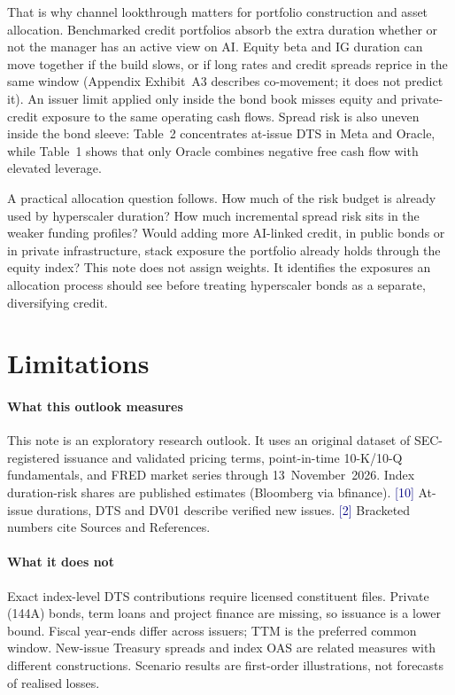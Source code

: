 \documentclass[10pt,letterpaper]{article}
\newcommand{\src}[1]{{\scriptsize\textcolor{navy}{[#1]}}}
\begin{document}
That is why channel lookthrough matters for portfolio construction and asset allocation. Benchmarked credit portfolios absorb the extra duration whether or not the manager has an active view on AI. Equity beta and IG duration can move together if the build slows, or if long rates and credit spreads reprice in the same window (Appendix Exhibit~A3 describes co-movement; it does not predict it). An issuer limit applied only inside the bond book misses equity and private-credit exposure to the same operating cash flows. Spread risk is also uneven inside the bond sleeve: Table~2 concentrates at-issue DTS in Meta and Oracle, while Table~1 shows that only Oracle combines negative free cash flow with elevated leverage.

A practical allocation question follows. How much of the risk budget is already used by hyperscaler duration? How much incremental spread risk sits in the weaker funding profiles? Would adding more AI-linked credit, in public bonds or in private infrastructure, stack exposure the portfolio already holds through the equity index? This note does not assign weights. It identifies the exposures an allocation process should see before treating hyperscaler bonds as a separate, diversifying credit.

\section{Limitations}

\paragraph{What this outlook measures}
This note is an exploratory research outlook. It uses an original dataset of SEC-registered issuance and validated pricing terms, point-in-time 10-K/10-Q fundamentals, and FRED market series through 13~November~2026. Index duration-risk shares are published estimates (Bloomberg via bfinance). \src{10} At-issue durations, DTS and DV01 describe verified new issues. \src{2} Bracketed numbers cite Sources and References.

\paragraph{What it does not}
Exact index-level DTS contributions require licensed constituent files. Private (144A) bonds, term loans and project finance are missing, so issuance is a lower bound. Fiscal year-ends differ across issuers; TTM is the preferred common window. New-issue Treasury spreads and index OAS are related measures with different constructions. Scenario results are first-order illustrations, not forecasts of realised losses.
\end{document}
